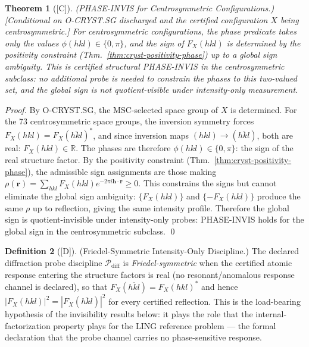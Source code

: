 \documentclass[12pt,oneside]{amsbook}
\theoremstyle{plain}
\newtheorem{theorem}{Theorem}[section]
\theoremstyle{definition}
\newtheorem{definition}[theorem]{Definition}
\theoremstyle{remark}
\newcommand{\status}[1]{\textup{[#1]}}
\begin{document}
\begin{theorem}[\status{C}]\label{thm:cryst-centro-PHASEINVIS}
\textup{(PHASE-INVIS for Centrosymmetric Configurations.)}
\textup{[Conditional on O-CRYST.SG discharged and the certified
configuration $X$ being centrosymmetric.]}
For centrosymmetric configurations, the phase predicate takes only
the values $\phi(hkl) \in \{0, \pi\}$, and the sign of
$F_X(hkl)$ is determined by the positivity constraint
(Thm.~\ref{thm:cryst-positivity-phase}) up to a global sign
ambiguity.  This is certified structural PHASE-INVIS in the
centrosymmetric subclass: no additional probe is needed to
constrain the phases to this two-valued set, and the global sign
is not quotient-visible under intensity-only measurement.
\end{theorem}

\begin{proof}
By O-CRYST.SG, the MSC-selected space group of $X$ is determined.
For the 73 centrosymmetric space groups, the inversion symmetry
forces $F_X(hkl) = F_X(\overline{hkl})^*$, and since inversion
maps $(hkl) \to (\overline{hkl})$, both are real: $F_X(hkl) \in
\mathbb{R}$.  The phases are therefore $\phi(hkl) \in \{0, \pi\}$:
the sign of the real structure factor.  By the positivity
constraint (Thm.~\ref{thm:cryst-positivity-phase}), the admissible
sign assignments are those making
$\rho(\mathbf{r}) = \sum_{hkl} F_X(hkl)
e^{-2\pi i\mathbf{h}\cdot\mathbf{r}} \ge 0$.  This constrains
the signs but cannot eliminate the global sign ambiguity:
$\{F_X(hkl)\}$ and $\{-F_X(hkl)\}$ produce the same $\rho$ up
to reflection, giving the same intensity profile.  Therefore the
global sign is quotient-invisible under intensity-only probes:
PHASE-INVIS holds for the global sign in the centrosymmetric
subclass.
\qed
\end{proof}

\begin{definition}[\status{D}]\label{def:cryst-friedel-discipline}
\textup{(Friedel-Symmetric Intensity-Only Discipline.)}
The declared diffraction probe discipline
$\mathcal{P}_{\mathrm{diff}}$ is \emph{Friedel-symmetric} when the
certified atomic response entering the structure factors is real
(no resonant/anomalous response channel is declared), so that
$F_X(\overline{hkl}) = F_X(hkl)^*$ and hence
$|F_X(hkl)|^2 = |F_X(\overline{hkl})|^2$ for every certified
reflection.  This is the load-bearing hypothesis of the
invisibility results below: it plays the role that the
internal-factorization property plays for the LING reference
problem --- the formal declaration that the probe channel carries
no phase-sensitive response.
\end{definition}
\end{document}
